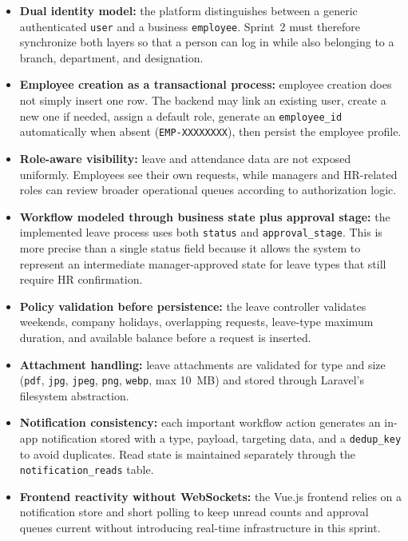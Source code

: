 \begin{itemize}
    \item \textbf{Dual identity model:} the platform distinguishes between a generic
    authenticated \texttt{user} and a business \texttt{employee}. Sprint~2 must therefore
    synchronize both layers so that a person can log in while also belonging to a branch,
    department, and designation.
    \item \textbf{Employee creation as a transactional process:} employee creation does not
    simply insert one row. The backend may link an existing user, create a new one if needed,
    assign a default role, generate an \texttt{employee\_id} automatically when absent
    (\texttt{EMP-XXXXXXXX}), then persist the employee profile.
    \item \textbf{Role-aware visibility:} leave and attendance data are not exposed uniformly.
    Employees see their own requests, while managers and HR-related roles can review broader
    operational queues according to authorization logic.
    \item \textbf{Workflow modeled through business state plus approval stage:} the implemented
    leave process uses both \texttt{status} and \texttt{approval\_stage}. This is more precise
    than a single status field because it allows the system to represent an intermediate
    manager-approved state for leave types that still require HR confirmation.
    \item \textbf{Policy validation before persistence:} the leave controller validates weekends,
    company holidays, overlapping requests, leave-type maximum duration, and available balance
    before a request is inserted.
    \item \textbf{Attachment handling:} leave attachments are validated for type and size
    (\texttt{pdf}, \texttt{jpg}, \texttt{jpeg}, \texttt{png}, \texttt{webp}, max 10~MB) and
    stored through Laravel's filesystem abstraction.
    \item \textbf{Notification consistency:} each important workflow action generates an
    in-app notification stored with a type, payload, targeting data, and a
    \texttt{dedup\_key} to avoid duplicates. Read state is maintained separately through the
    \texttt{notification\_reads} table.
    \item \textbf{Frontend reactivity without WebSockets:} the Vue.js frontend relies on a
    notification store and short polling to keep unread counts and approval queues current
    without introducing real-time infrastructure in this sprint.
\end{itemize}


